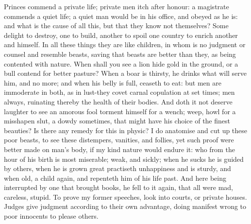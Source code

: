{ Princes commend a private life; private men itch after honour: a
magistrate commends a quiet life; a quiet man would be in his office,
and obeyed as he is: and what is the cause of all this, but that they
know not themselves? Some delight to destroy, one to build,
another to spoil one country to enrich another and himself. In all
these things they are like children, in whom is no judgment or counsel
and resemble beasts, saving that beasts are better than they, as being
contented with nature.  When shall you see a lion hide gold in the
ground, or a bull contend for better pasture? When a boar is thirsty,
he drinks what will serve him, and no more; and when his belly is full,
ceaseth to eat: but men are immoderate in both, as in lust-they covet
carnal copulation at set times; men always, ruinating thereby the
health of their bodies. And doth it not deserve laughter to see an
amorous fool torment himself for a wench; weep, howl for a misshapen
slut, a dowdy sometimes, that might have his choice of the finest
beauties? Is there any remedy for this in physic? I do anatomise and
cut up these poor beasts, to see these distempers, vanities, and
follies, yet such proof were better made on man's body, if my kind
nature would endure it: who from the hour of his birth is most
miserable; weak, and sickly; when he sucks he is guided by others, when
he is grown great practiseth unhappiness and is sturdy, and when
old, a child again, and repenteth him of his life past. And here being
interrupted by one that brought books, he fell to it again, that all
were mad, careless, stupid. To prove my former speeches, look into
courts, or private houses. Judges give judgment according to their
own advantage, doing manifest wrong to poor innocents to please others.

}
